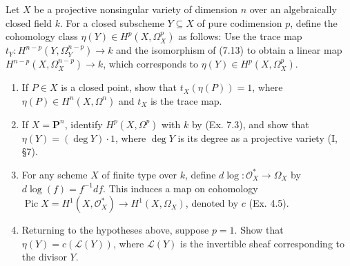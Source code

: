 Let $X$ be a projective nonsingular variety of dimension $n$ over an algebraically closed field $k$. For a closed subscheme $Y \subseteq X$ of pure codimension $p$, define the cohomology class $\eta(Y) \in H^p(X, \Omega_X^p)$ as follows: Use the trace map $t_Y: H^{n-p}(Y, \Omega_Y^{n-p}) \to k$ and the isomorphism of (7.13) to obtain a linear map $H^{n-p}(X, \Omega_X^{n-p}) \to k$, which corresponds to $\eta(Y) \in H^p(X, \Omega_X^p)$.

\begin{enumerate}
\item[(a)] If $P \in X$ is a closed point, show that $t_X(\eta(P)) = 1$, where $\eta(P) \in H^n(X, \Omega^n)$ and $t_X$ is the trace map.

\item[(b)] If $X = \mathbf{P}^n$, identify $H^p(X, \Omega^p)$ with $k$ by (Ex. 7.3), and show that $\eta(Y) = (\deg Y) \cdot 1$, where $\deg Y$ is its degree as a projective variety (I, \S7).

\item[(c)] For any scheme $X$ of finite type over $k$, define $d\log: \mathcal{O}_X^* \to \Omega_X$ by $d\log(f) = f^{-1}df$. This induces a map on cohomology $\operatorname{Pic} X = H^1(X, \mathcal{O}_X^*) \to H^1(X, \Omega_X)$, denoted by $c$ (Ex. 4.5).

\item[(d)] Returning to the hypotheses above, suppose $p = 1$. Show that $\eta(Y) = c(\mathcal{L}(Y))$, where $\mathcal{L}(Y)$ is the invertible sheaf corresponding to the divisor $Y$.
\end{enumerate}

